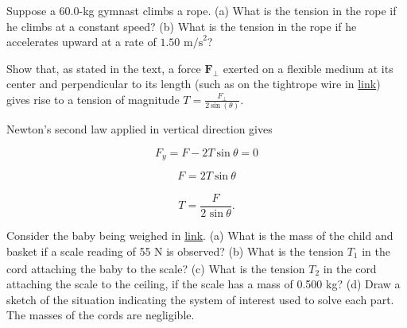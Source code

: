 \documentclass[
]{book}
\newenvironment{unnumbered}{}{}
\newenvironment{problems-exercises}{}{}
\begin{document}
\begin{problems-exercises}
\hypertarget{fs-id1914521}{}
\leavevmode\hypertarget{fs-id1914522}{}%
Suppose a 60.0-kg gymnast climbs a rope. (a) What is the tension in the
rope if he climbs at a constant speed? (b) What is the tension in the
rope if he accelerates upward at a rate of
\({1\text{.}\text{50\ m/s}^{2}}{}\)?

\hypertarget{fs-id858402}{}
\leavevmode\hypertarget{fs-id858403}{}%
Show that, as stated in the text, a force \(\textbf{F}_{\bot}{}\) exerted
on a flexible medium at its center and perpendicular to its length (such
as on the tightrope wire in
\protect\hyperlink{import-auto-id2091042}{link}) gives rise to a
tension of magnitude \({T = \frac{F_{\bot}}{2\ \text{sin}\ (\theta)}}{}\).

\leavevmode\hypertarget{fs-id1443905}{}%
Newton's second law applied in vertical direction gives

\hypertarget{eip-id572267}{}
\begin{unnumbered}

\[{{F_{y} = {F - 2T}\ }\text{sin}\ {\theta = 0}}{}\]

\end{unnumbered}

\hypertarget{eip-id1779725}{}
\begin{unnumbered}

\[{{F_{} = 2T\ }\text{sin}\ \theta}{}\]

\end{unnumbered}

\hypertarget{eip-id1533937}{}
\begin{unnumbered}

\[{T = \frac{F_{}}{\text{2\ sin}\ \theta}}.\]

\end{unnumbered}

\hypertarget{fs-id2372303}{}
\leavevmode\hypertarget{fs-id1919325}{}%
Consider the baby being weighed in
\protect\hyperlink{import-auto-id2140140}{link}. (a) What is the
mass of the child and basket if a scale reading of 55 N is observed? (b)
What is the tension \(T_{1}{}\)\textsubscript{} in the
cord attaching the baby to the scale? (c) What is the tension \(T_{2}{}\)
in the cord attaching the scale to the ceiling, if the scale has a mass
of 0.500 kg? (d) Draw a sketch of the situation indicating the system of
interest used to solve each part. The masses of the cords are
negligible.


\end{problems-exercises}
\end{document}
